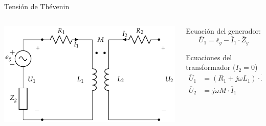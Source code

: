 \documentclass[aspectratio=169, usenames,svgnames,dvipsnames]{beamer}
\begin{document}
\begin{frame}[label={sec:orgbf83730}]{Tensión de Thévenin}
\begin{columns}
\begin{column}{0.5\columnwidth}
\begin{center}
\includegraphics[height=0.5\textheight]{../figs/Trafo_Real_FuentePrimario.pdf}
\end{center}
\end{column}
\begin{column}{0.5\columnwidth}
Ecuación del generador:
\[
  \overline{U}_1 = \overline{\epsilon}_g - \overline{I}_1 \cdot \overline{Z}_g
\]

Ecuaciones del transformador (\(\overline{I}_2 = 0\))
\begin{align*}
  \overline{U}_1 &= (R_1 + j \omega L_1) \cdot \overline{I}_1\\
  \overline{U}_2 &= j \omega M \cdot \overline{I}_1
\end{align*}
\end{column}
\end{columns}
\end{frame}
\end{document}
